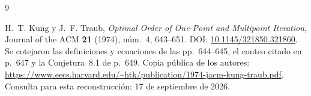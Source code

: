 \documentclass[11pt,a4paper]{article}
\numberwithin{equation}{section}
\theoremstyle{definition}
\theoremstyle{remark}
\begin{document}
\par\bigskip
\begin{thebibliography}{9}
H.~T. Kung y J.~F. Traub,
\emph{Optimal Order of One-Point and Multipoint Iteration},
Journal of the ACM \textbf{21} (1974), núm.~4, 643--651.
DOI: \href{https://doi.org/10.1145/321850.321860}{10.1145/321850.321860}.
Se cotejaron las definiciones y ecuaciones de las pp.~644--645, el conteo citado en p.~647 y la Conjetura~8.1 de p.~649.
Copia pública de los autores:
\url{https://www.eecs.harvard.edu/~htk/publication/1974-jacm-kung-traub.pdf}.
Consulta para esta reconstrucción: 17 de septiembre de 2026.
\end{thebibliography}
\end{document}
